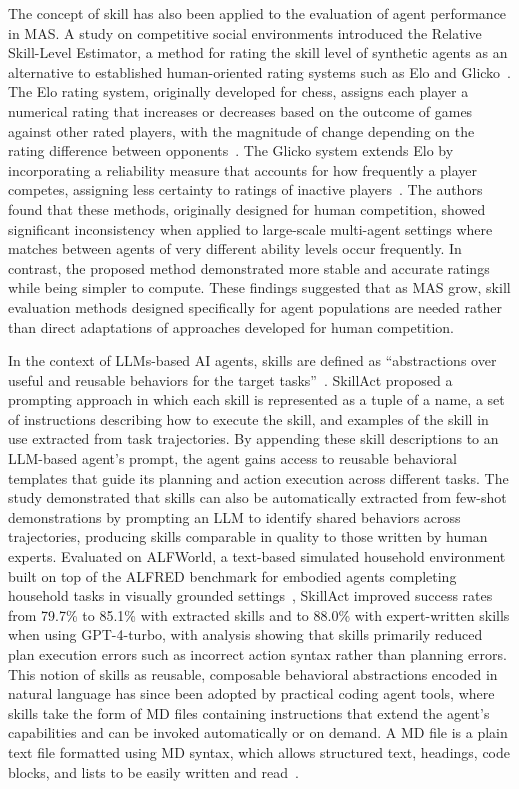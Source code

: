 \documentclass[
english,                 %
bibtex,                  %
includeExtraAbstracts, %
]{kththesis}
\numberwithin{listing}{chapter}
\begin{document}
The concept of skill has also been applied to the evaluation of agent performance in \gls{MAS}. A study on competitive social environments introduced the Relative Skill-Level Estimator, a method for rating the skill level of synthetic agents as an alternative to established human-oriented rating systems such as Elo and Glicko~\cite{kiourt_rating_2019}. The Elo rating system, originally developed for chess, assigns each player a numerical rating that increases or decreases based on the outcome of games against other rated players, with the magnitude of change depending on the rating difference between opponents~\cite{elo_rating_1978}. The Glicko system extends Elo by incorporating a reliability measure that accounts for how frequently a player competes, assigning less certainty to ratings of inactive players~\cite{glickman_glicko_2016}. The authors found that these methods, originally designed for human competition, showed significant inconsistency when applied to large-scale multi-agent settings where matches between agents of very different ability levels occur frequently. In contrast, the proposed method demonstrated more stable and accurate ratings while being simpler to compute. These findings suggested that as \gls{MAS} grow, skill evaluation methods designed specifically for agent populations are needed rather than direct adaptations of approaches developed for human competition.

In the context of \glspl{LLM}-based \gls{AI} agents, skills are defined as ``abstractions over useful and reusable behaviors for the target tasks''~\cite{liu_skillact_2024}. SkillAct proposed a prompting approach in which each skill is represented as a tuple of a name, a set of instructions describing how to execute the skill, and examples of the skill in use extracted from task trajectories. By appending these skill descriptions to an \gls{LLM}-based agent's prompt, the agent gains access to reusable behavioral templates that guide its planning and action execution across different tasks. The study demonstrated that skills can also be automatically extracted from few-shot demonstrations by prompting an \gls{LLM} to identify shared behaviors across trajectories, producing skills comparable in quality to those written by human experts. Evaluated on \gls{ALF}World, a text-based simulated household environment built on top of the \gls{ALFRED} benchmark for embodied agents completing household tasks in visually grounded settings~\cite{shridhar_alfworld_2021}, SkillAct improved success rates from 79.7\% to 85.1\% with extracted skills and to 88.0\% with expert-written skills when using \gls{GPT}-4-turbo, with analysis showing that skills primarily reduced plan execution errors such as incorrect action syntax rather than planning errors. This notion of skills as reusable, composable behavioral abstractions encoded in natural language has since been adopted by practical coding agent tools, where skills take the form of \gls{MD} files containing instructions that extend the agent's capabilities and can be invoked automatically or on demand. A \gls{MD} file is a plain text file formatted using \gls{MD} syntax, which allows structured text, headings, code blocks, and lists to be easily written and read~\cite{gruber_daring_2004}.
\end{document}
